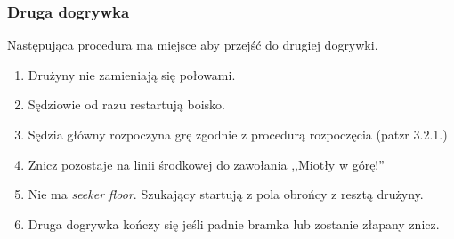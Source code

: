 \documentclass[11pt,a4paper]{article}
\begin{document}
\subsubsection{Druga dogrywka}
Następująca procedura ma miejsce aby przejść do drugiej dogrywki.
\begin{enumerate}
  \item Drużyny nie zamieniają się połowami.
  \item Sędziowie od razu restartują boisko.
  \item Sędzia główny rozpoczyna grę zgodnie z procedurą rozpoczęcia (patzr 3.2.1.) %
  \item Znicz pozostaje na linii środkowej do zawołania ,,Miotły w górę!''
  \item Nie ma \emph{seeker floor}. Szukający startują z pola obrońcy z resztą drużyny.
  \item Druga dogrywka kończy się jeśli padnie bramka lub zostanie złapany znicz.
\end{enumerate}

%
%
%
%
%
%

\newpage
\end{document}
